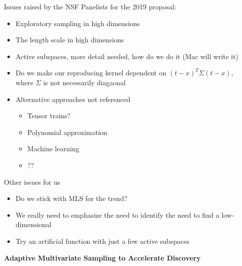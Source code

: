 \documentclass[11pt]{NSFamsart}
\begin{document}

{\color{red}
Issues raised by the NSF Panelists for the 2019 proposal:
\begin{itemize}
	\item Exploratory sampling in high dimensions
	\item The length scale in high dimensions
	\item Active subspaces, more detail needed, how do we do it (Mac will write it)
	\item Do we make our reproducing kernel  dependent on $(t - x)^T \Sigma (t-x)$, where $\Sigma$ is not necessarily diagaonal
	\item Alternative approaches not referenced
	\begin{itemize}
		\item Tensor trains?
		\item Polynomial approximation
		\item Machine learning
		\item ??
	\end{itemize}
\end{itemize}

Other issues for us
\begin{itemize}
	\item Do we stick with MLS for the trend?
	\item We really need to emphasize the need to identify the need to find a low-dimensional 
	\item Try an artificial function with just a few active subspaces
\end{itemize}
}

\begin{center}
\Large \textbf{
Adaptive Multivariate Sampling to Accelerate Discovery\\ 
}
\end{center}
\vspace{-2ex}

\setcounter{tocdepth}{1}
\tableofcontents

\vspace{-6ex}
\end{document}
